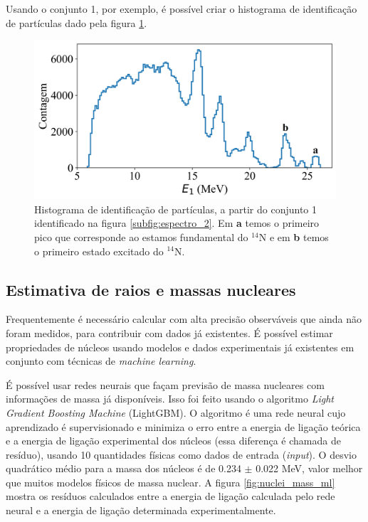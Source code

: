 \documentclass[a4paper,12pt,oneside]{book}
\begin{document}
\par Usando o conjunto 1, por exemplo, é possível criar o histograma de identificação de partículas dado pela figura \ref{fig:PID_hist}.

\begin{figure}[H]
    \centering
    \includegraphics[scale=0.11]{figs/espectro_3.png}
    \caption{Histograma de identificação de partículas, a partir do conjunto 1 identificado na figura \ref{subfig:espectro_2}. Em \textbf{a} temos o primeiro pico que corresponde ao estamos fundamental do $^{14}$N e em \textbf{b} temos o primeiro estado excitado do $^{14}$N.}
    \label{fig:PID_hist}
\end{figure}

\subsection{Estimativa de raios e massas nucleares}

\par Frequentemente é necessário calcular com alta precisão observáveis que ainda não foram medidos, para contribuir com dados já existentes. É possível estimar propriedades de núcleos usando modelos e dados experimentais já existentes em conjunto com técnicas de \textit{machine learning}.

\par É possível usar redes neurais que façam previsão de massa nucleares com informações de massa já disponíveis. Isso foi feito usando o algoritmo \textit{Light Gradient Boosting Machine} (LightGBM)\cite{LightGBM}. O algoritmo é uma rede neural cujo aprendizado é supervisionado e minimiza o erro entre a energia de ligação teórica e a energia de ligação experimental dos núcleos (essa diferença é chamada de resíduo), usando 10 quantidades físicas como dados de entrada (\textit{input})\cite{nuclear_mass}. O desvio quadrático médio para a massa dos núcleos é de 0.234 $\pm$ 0.022 MeV, valor melhor que muitos modelos físicos de massa nuclear. A figura \ref{fig:nuclei_mass_ml} mostra os resíduos calculados entre a energia de ligação calculada pelo rede neural e a energia de ligação determinada experimentalmente.
\end{document}
